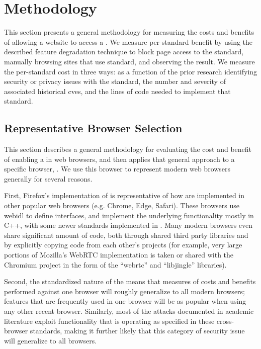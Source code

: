 \section{Methodology}
\label{cost-benefit:methodology}

This section presents a general methodology for measuring the costs and
benefits of allowing a website to access a \WAS.  We measure per-standard
benefit by using the described feature degradation technique to block page
access to the standard, manually browsing sites that use standard, and
observing the result.  We measure the per-standard cost in three ways: as a
function of the prior research identifying security or privacy issues with the
standard, the number and severity of associated historical \gls{cve}s, and the
lines of code needed to implement that standard.


\subsection{Representative Browser Selection}
\label{cost-benefit:methodology:methodology-browser}
This section describes a general methodology for evaluating the cost and
benefit of enabling a \WAS in web browsers, and then applies that
general approach to a specific browser, \textbf{\FFWithVersion}.  We use
this browser to represent modern web browsers generally for several reasons.

First, Firefox's implementation of \WASs is representative of how
\WASs are implemented in other popular web browsers (e.g. Chrome, Edge,
Safari).  These browsers use \gls{webidl} to define \WAPI interfaces, and
implement the underlying functionality mostly in C++, with some newer standards
implemented in \JS.  Many modern browsers even share significant amount of
code, both through shared third party libraries and by explicitly copying code
from each other's projects (for example, very large portions of Mozilla's
WebRTC implementation is taken or shared with the Chromium project in the form
of the ``webrtc'' and ``libjingle'' libraries).

Second, the standardized nature of the \WAPI means that measures of
\WAPI costs and benefits performed against one browser will roughly generalize
to all modern browsers; features that are frequently used in one browser will
be as popular when using any other recent browser.  Similarly, most of the
attacks documented in academic literature exploit functionality that is
operating as specified in these cross-browser standards, making it further
likely that this category of security issue will generalize to all browsers.

